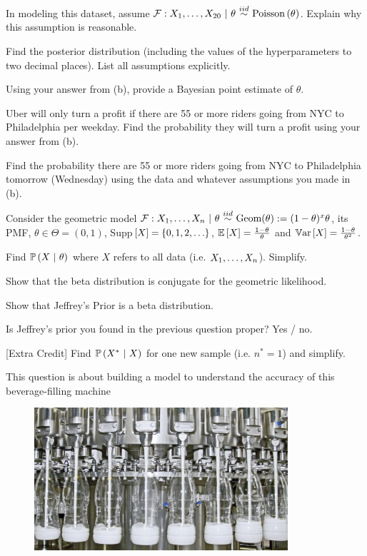 \documentclass[12pt]{article}
\begin{document}
\benum

 In modeling this dataset, assume $\mathcal{F}: X_1, \ldots, X_{20}~|~\theta \iid \poisson{\theta}$. Explain why this assumption is reasonable.

 Find the posterior distribution (including the values of the hyperparameters to two decimal places). List all assumptions explicitly. 

 Using your answer from (b), provide a Bayesian point estimate of $\theta$. 

 Uber will only turn a profit if there are 55 or more riders going from NYC to Philadelphia per weekday. Find the probability they will turn a profit using your answer from (b). 


 Find the probability there are 55 or more riders going from NYC to Philadelphia tomorrow (Wednesday) using the data and whatever assumptions you made in (b). 


\eenum

\problem Consider the geometric model $\mathcal{F} : \Xoneton~|~\theta \iid \text{Geom}(\theta) := (1 - \theta)^x \theta$, its PMF, $\theta \in \Theta = (0, 1)$, Supp$\left[X\right] = \left\{0, 1, 2, \ldots\right\}$, $\mathbb{E}\left[X\right] = \frac{1 - \theta}{\theta}$ and $\mathbb{V}\text{ar}\left[X\right] = \frac{1 - \theta}{\theta^2}$.

\benum

 Find $\mathbb{P}\left(X~|~\theta\right)$ where $X$ refers to all data (i.e. $X_1, \ldots, X_n$). Simplify.

 Show that the beta distribution is conjugate for the geometric likelihood.

 Show that Jeffrey's Prior is a beta distribution. 


 Is Jeffrey's prior you found in the previous question proper? Yes / no. 

 [Extra Credit] Find $\mathbb{P}\left(X^*~|~X\right)$ for one new sample (i.e. $n^* = 1$) and simplify. 

\eenum

\problem This question is about building a model to understand the accuracy of this beverage-filling machine

\begin{figure}[htp]
\centering
\includegraphics[width=3.7in]{milk_filling.jpg}
\end{figure}
\end{document}
